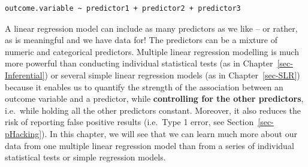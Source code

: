 \documentclass[
  letterpaper,
  DIV=11,
  numbers=noendperiod]{scrreprt}
\begin{document}
\begin{verbatim}
outcome.variable ~ predictor1 + predictor2 + predictor3
\end{verbatim}

A linear regression model can include as many predictors as we like --
or rather, as is meaningful and we have data for! The predictors can be
a mixture of numeric and categorical predictors. Multiple linear
regression modelling is much more powerful than conducting individual
statistical tests (as in Chapter~\ref{sec-Inferential}) or several
simple linear regression models (as in Chapter~\ref{sec-SLR}) because it
enables us to quantify the strength of the association between an
outcome variable and a predictor, while \textbf{controlling for the
other predictors}, i.e.~while holding all the other predictors constant.
Moreover, it also reduces the risk of reporting false positive results
(i.e.~Type 1 error, see Section~\ref{sec-pHacking}). In this chapter, we
will see that we can learn much more about our data from one multiple
linear regression model than from a series of individual statistical
tests or simple regression models.
\end{document}
